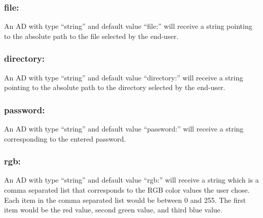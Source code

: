 \subsubsection*{file:}
An AD with type ``string'' and default value ``file:'' will receive a string
pointing to the absolute path to the file selected by the end-user.

\subsubsection*{directory:}
An AD with type ``string'' and default value ``directory:'' will receive a string
pointing to the absolute path to the directory selected by the end-user.

\subsubsection*{password:}
An AD with type ``string'' and default value ``password:'' will receive a string
corresponding to the entered password.

\subsubsection*{rgb:} 
An AD with type ``string'' and default value ``rgb:'' will
receive a string which is a comma separated list that corresponds to the RGB
color values the user chose. Each item in the comma separated list would be
between 0 and 255. The first item would be the red value, second green value,
and third blue value.
